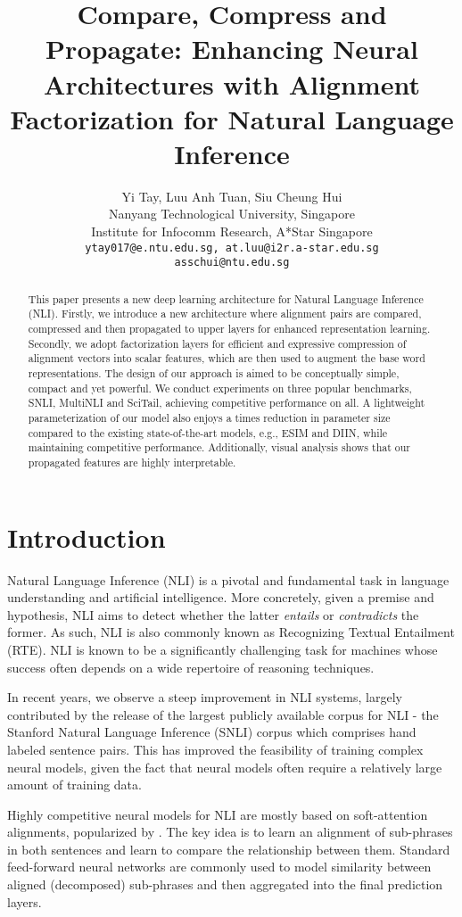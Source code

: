 \documentclass[11pt,a4paper]{article}
\title{Compare, Compress and Propagate: Enhancing Neural Architectures with Alignment Factorization for Natural Language Inference}
\author{Yi Tay, Luu Anh Tuan, Siu Cheung Hui \\
  Nanyang Technological University, Singapore \\
  Institute for Infocomm Research, A*Star Singapore \\
  {\tt ytay017@e.ntu.edu.sg, at.luu@i2r.a-star.edu.sg} \\
  {\tt asschui@ntu.edu.sg} \\
  }
\date{}
\begin{document}
\maketitle
\begin{abstract}
This paper presents a new deep learning architecture for Natural Language Inference (NLI). Firstly, we introduce a new architecture where alignment pairs are compared, compressed and then propagated to upper layers for enhanced representation learning. Secondly, we adopt factorization layers for efficient and expressive compression of alignment vectors into scalar features, which are then used to augment the base word representations. The design of our approach is aimed to be conceptually simple, compact and yet powerful. We conduct experiments on three popular benchmarks, SNLI, MultiNLI and SciTail, achieving competitive performance on all. A lightweight parameterization of our model also enjoys a  times reduction in parameter size compared to the existing state-of-the-art models, e.g., ESIM and DIIN, while maintaining competitive performance. Additionally, visual analysis shows that our propagated features are highly interpretable.
 \end{abstract}

 \section{Introduction}
Natural Language Inference (NLI) is a pivotal and fundamental task in language understanding and artificial intelligence. More concretely, given a premise and hypothesis, NLI aims to detect whether the latter \textit{entails} or \textit{contradicts} the former. As such, NLI is also commonly known as Recognizing Textual Entailment (RTE). NLI is known to be a significantly challenging task for machines whose success often depends on a wide repertoire of reasoning techniques.

In recent years, we observe a steep improvement in NLI systems, largely contributed by the release of the largest publicly available corpus for NLI - the Stanford Natural Language Inference (SNLI) corpus \cite{DBLP:conf/emnlp/BowmanAPM15} which comprises  hand labeled sentence pairs. This has improved the feasibility of training complex neural models, given the fact that neural models often require a relatively large amount of training data.

Highly competitive neural models for NLI are mostly based on soft-attention alignments, popularized by \cite{DBLP:conf/emnlp/ParikhT0U16,rocktaschel2015reasoning}. The key idea is to learn an alignment of sub-phrases in both sentences and learn to compare the relationship between them. Standard feed-forward neural networks are commonly used to model similarity between aligned (decomposed) sub-phrases and then aggregated into the final prediction layers.
\end{document}
